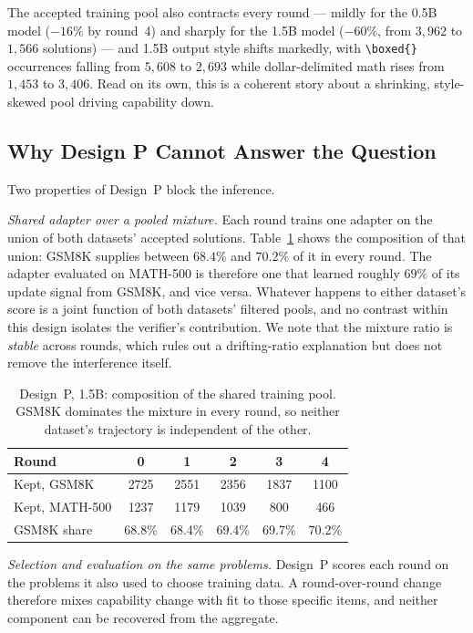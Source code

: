 \documentclass[runningheads]{llncs}
\begin{document}
The accepted training pool also contracts every round --- mildly for the
0.5B model ($-16\%$ by round~4) and sharply for the 1.5B model ($-60\%$,
from $3{,}962$ to $1{,}566$ solutions) --- and 1.5B output style shifts
markedly, with \verb|\boxed{}| occurrences falling from $5{,}608$ to
$2{,}693$ while dollar-delimited math rises from $1{,}453$ to $3{,}406$.
Read on its own, this is a coherent story about a shrinking, style-skewed
pool driving capability down.

\subsection{Why Design P Cannot Answer the Question}
\label{sec:confound}

Two properties of Design~P block the inference.

\emph{Shared adapter over a pooled mixture.} Each round trains one adapter
on the union of both datasets' accepted solutions.
Table~\ref{tab:poolmix} shows the composition of that union: GSM8K supplies
between $68.4\%$ and $70.2\%$ of it in every round. The adapter evaluated
on MATH-500 is therefore one that learned roughly $69\%$ of its update
signal from GSM8K, and vice versa. Whatever happens to either dataset's
score is a joint function of both datasets' filtered pools, and no
contrast within this design isolates the verifier's contribution. We note
that the mixture ratio is \emph{stable} across rounds, which rules out a
drifting-ratio explanation but does not remove the interference itself.

\begin{table}[t]
\caption{Design~P, 1.5B: composition of the shared training pool. GSM8K
dominates the mixture in every round, so neither dataset's trajectory is
independent of the other.}
\label{tab:poolmix}
\centering
\begin{tabular}{lccccc}
\toprule
Round & 0 & 1 & 2 & 3 & 4 \\
\midrule
Kept, GSM8K & 2725 & 2551 & 2356 & 1837 & 1100 \\
Kept, MATH-500 & 1237 & 1179 & 1039 & 800 & 466 \\
GSM8K share & 68.8\% & 68.4\% & 69.4\% & 69.7\% & 70.2\% \\
\bottomrule
\end{tabular}
\end{table}

\emph{Selection and evaluation on the same problems.} Design~P scores each
round on the problems it also used to choose training data. A round-over-round
change therefore mixes capability change with fit to those specific items,
and neither component can be recovered from the aggregate.
\end{document}
